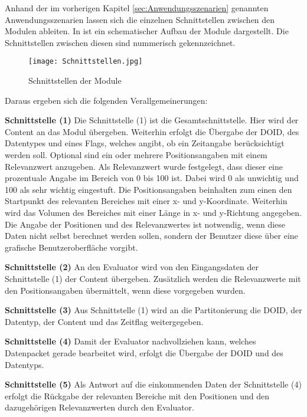 Anhand der im vorherigen Kapitel \ref{sec:Anwendungsszenarien} genannten Anwendungsszenarien lassen
sich die einzelnen Schnittstellen zwischen den Modulen ableiten. In
 ist ein schematischer Aufbau der Module
dargestellt. Die Schnittstellen zwischen diesen sind nummerisch gekennzeichnet.

\begin{figure}[H]
\centering
\texttt{[image: Schnittstellen.jpg]}
\caption{Schnittstellen der Module}
\label{fig:Schnittstellen}
\end{figure}

Daraus ergeben sich die folgenden Verallgemeinerungen:

\textbf{Schnittstelle (1)}\newline
Die Schnittstelle (1) ist die Gesamtschnittstelle. Hier wird der
Content an das Modul übergeben. Weiterhin erfolgt die Übergabe der DOID, des
Datentypes und eines Flags, welches angibt, ob ein Zeitangabe berücksichtigt
werden soll.
Optional sind ein oder mehrere Positionsangaben mit einem Relevanzwert
anzugeben. Als Relevanzwert wurde festgelegt, dass dieser eine prozentuale
Angabe im Bereich von 0 bis 100 ist. Dabei wird 0 als unwichtig und 100 als
sehr wichtig eingestuft. Die Positionsangaben beinhalten zum einen den
Startpunkt des relevanten Bereiches mit einer x- und y-Koordinate. Weiterhin
wird das Volumen des Bereiches mit einer Länge in x- und y-Richtung angegeben.
Die Angabe der Positionen und des Relevanzwertes ist \zB notwendig, wenn diese
Daten nicht selbst berechnet werden sollen, sondern der Benutzer diese über eine
grafische Benutzeroberfläche vorgibt.

\textbf{Schnittstelle (2)} \newline
An den Evaluator wird von den Eingangsdaten der Schnittstelle (1)
der Content übergeben. Zusätzlich werden die Relevanzwerte mit den
Positionsangaben übermittelt, wenn diese vorgegeben wurden.

\textbf{Schnittstelle (3)} \newline
Aus Schnittstelle (1) wird an die Partitonierung
die DOID, der Datentyp, der Content und das Zeitflag weitergegeben.

\textbf{Schnittstelle (4)} \newline
Damit der Evaluator nachvollziehen kann, welches Datenpacket gerade bearbeitet
wird, erfolgt die Übergabe der DOID und des Datentyps.  

\textbf{Schnittstelle (5)} \newline
Als Antwort auf die einkommenden Daten der Schnittstelle (4)
erfolgt die Rückgabe der relevanten Bereiche mit den Positionen und den
dazugehörigen Relevanzwerten durch den Evaluator.

